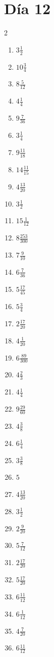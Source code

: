 \documentclass[12pt]{article}
\begin{document}
\section*{Día 12}
\begin{multicols}{2}\begin{enumerate}
\item $ 3 \frac{1}{2} $
\item $ 10 \frac{3}{4} $
\item $ 8 \frac{5}{12} $
\item $ 4 \frac{1}{4} $
\item $ 9 \frac{7}{36} $
\item $ 3 \frac{1}{4} $
\item $ 9 \frac{11}{18} $
\item $ 14 \frac{11}{15} $
\item $ 4 \frac{13}{20} $
\item $ 3 \frac{1}{2} $
\item $ 15 \frac{1}{12} $
\item $ 8 \frac{253}{300} $
\item $ 7 \frac{9}{10} $
\item $ 6 \frac{7}{36} $
\item $ 5 \frac{17}{45} $
\item $ 5 \frac{3}{4} $
\item $ 2 \frac{17}{20} $
\item $ 4 \frac{1}{20} $
\item $ 6 \frac{89}{300} $
\item $ 4 \frac{2}{3} $
\item $ 4 \frac{1}{4} $
\item $ 9 \frac{29}{60} $
\item $ 4 \frac{3}{8} $
\item $ 6 \frac{1}{4} $
\item $ 3 \frac{3}{8} $
\item $ 5 $
\item $ 4 \frac{13}{20} $
\item $ 3 \frac{1}{2} $
\item $ 2 \frac{9}{20} $
\item $ 5 \frac{7}{12} $
\item $ 2 \frac{17}{20} $
\item $ 5 \frac{17}{20} $
\item $ 6 \frac{11}{12} $
\item $ 6 \frac{1}{12} $
\item $ 4 \frac{7}{20} $
\item $ 6 \frac{11}{12} $

\end{enumerate}
\end{multicols}
\end{document}
